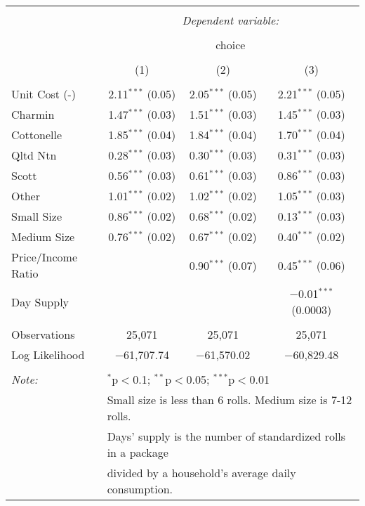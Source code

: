 
\begin{table}[!htbp] \centering 
  \caption{} 
  \label{tab:mnlPhillyBaseline} 
\begin{tabular}{@{\extracolsep{5pt}}lccc} 
\\[-1.8ex]\hline 
\hline \\[-1.8ex] 
 & \multicolumn{3}{c}{\textit{Dependent variable:}} \\ 
\cline{2-4} 
\\[-1.8ex] & \multicolumn{3}{c}{choice} \\ 
\\[-1.8ex] & (1) & (2) & (3)\\ 
\hline \\[-1.8ex] 
 Unit Cost (-) & 2.11$^{***}$ (0.05) & 2.05$^{***}$ (0.05) & 2.21$^{***}$ (0.05) \\ 
  Charmin & 1.47$^{***}$ (0.03) & 1.51$^{***}$ (0.03) & 1.45$^{***}$ (0.03) \\ 
  Cottonelle & 1.85$^{***}$ (0.04) & 1.84$^{***}$ (0.04) & 1.70$^{***}$ (0.04) \\ 
  Qltd Ntn & 0.28$^{***}$ (0.03) & 0.30$^{***}$ (0.03) & 0.31$^{***}$ (0.03) \\ 
  Scott & 0.56$^{***}$ (0.03) & 0.61$^{***}$ (0.03) & 0.86$^{***}$ (0.03) \\ 
  Other & 1.01$^{***}$ (0.02) & 1.02$^{***}$ (0.02) & 1.05$^{***}$ (0.03) \\ 
  Small Size & 0.86$^{***}$ (0.02) & 0.68$^{***}$ (0.02) & 0.13$^{***}$ (0.03) \\ 
  Medium Size & 0.76$^{***}$ (0.02) & 0.67$^{***}$ (0.02) & 0.40$^{***}$ (0.02) \\ 
  Price/Income Ratio &  & 0.90$^{***}$ (0.07) & 0.45$^{***}$ (0.06) \\ 
  Day Supply &  &  & $-$0.01$^{***}$ (0.0003) \\ 
 \hline \\[-1.8ex] 
Observations & 25,071 & 25,071 & 25,071 \\ 
Log Likelihood & $-$61,707.74 & $-$61,570.02 & $-$60,829.48 \\ 
\hline 
\hline \\[-1.8ex] 
\textit{Note:}  & \multicolumn{3}{l}{$^{*}$p$<$0.1; $^{**}$p$<$0.05; $^{***}$p$<$0.01} \\ 
 & \multicolumn{3}{l}{Small size is less than 6 rolls. Medium size is 7-12 rolls. } \\ 
 & \multicolumn{3}{l}{Days' supply is the number of standardized rolls in a package} \\ 
 & \multicolumn{3}{l}{divided by a household's average daily consumption.} \\ 
\end{tabular} 
\end{table} 

